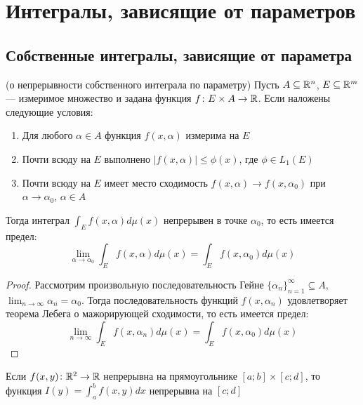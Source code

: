 \section{Интегралы, зависящие от параметров}

\subsection{Собственные интегралы, зависящие от параметра}

\begin{theorem} (о непрерывности собственного интеграла по параметру)
	Пусть $A \subseteq \mathbb{R}^n$, $E \subseteq \mathbb{R}^m$ --- измеримое множество и задана функция $f \colon E \times A \to \mathbb{R}$. Если наложены следующие условия:
	\begin{enumerate}
		\item Для любого $\alpha \in A$ функция $f(x, \alpha)$ измерима на $E$
		
		\item Почти всюду на $E$ выполнено $|f(x, \alpha)| \le \phi(x)$, где $\phi \in L_1(E)$
		
		\item Почти всюду на $E$ имеет место сходимость $f(x, \alpha) \to f(x, \alpha_0)$ при $\alpha \to \alpha_0$, $\alpha \in A$
	\end{enumerate}
	Тогда интеграл $\int_E f(x, \alpha)d\mu(x)$ непрерывен в точке $\alpha_0$, то есть имеется предел:
	\[
		\lim_{\alpha \to \alpha_0} \int_E f(x, \alpha)d\mu(x) = \int_E f(x, \alpha_0)d\mu(x)
	\]
\end{theorem}

\begin{proof}
	Рассмотрим произвольную последовательность Гейне $\{\alpha_n\}_{n = 1}^\infty \subseteq A$, \\ $\lim_{n \to \infty} \alpha_n = \alpha_0$. Тогда последовательность функций $f(x, \alpha_n)$ удовлетворяет теорема Лебега о мажорирующей сходимости, то есть имеется предел:
	\[
		\lim_{n \to \infty} \int_E f(x, \alpha_n)d\mu(x) = \int_E f(x, \alpha_0)d\mu(x)
	\]
\end{proof}

\begin{corollary}
	Если $f(x, y) \colon \mathbb{R}^2 \to \mathbb{R}$ непрерывна на прямоугольнике $[a; b] \times [c; d]$, то функция $I(y) = \int_a^b f(x, y)dx$ непрерывна на $[c; d]$
\end{corollary}

